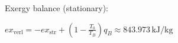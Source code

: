 Exergy balance (stationary):  

\( ex_{\text{verl}} = -ex_{\text{str}} + \left( 1 - \frac{T_0}{T_B} \right) q_B \approx 843.973 \, \text{kJ/kg} \)